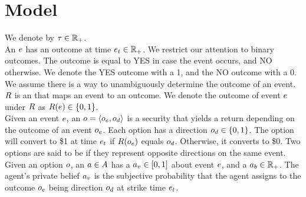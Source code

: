 \section{Model}

We denote  by $\tau\in\mathbb{R}_+$. \\

An  $e$ has an outcome at time $e_t \in \mathbb{R}_+$. 
We restrict our attention to binary outcomes. 
The outcome is equal to YES in case the event occurs, and NO otherwise. 
We denote the YES outcome with a 1, and the NO outcome with a 0.
We assume there is a way to unambiguously determine the outcome of an event. \\

$R$ is an  that maps an event to an outcome.
We denote the outcome of event $e$ under $R$ as 
$R(e) \in \{0,1\}$.\\

Given an event $e$, an  $o = \left<o_e, o_d\right>$ is a security that yields a return depending on 
the outcome of an event $o_e$. Each option has a direction 
$o_d \in \{0, 1\}$. 
The option will convert to \$1 at time $e_t$ if $R(o_e)$ equals 
$o_d$. Otherwise, it converts to \$0. Two options are said to be
 if they represent opposite directions on the same event.\\ 


Given an option $o$, an  $a\in A$ has a  
$a_v \in [0,1]$ about event $e$, and a  $a_b \in \mathbb{R}_+$.
The agent's private belief $a_v$ 
is the subjective probability that the agent
assigns to the outcome $o_e$ being direction $o_d$
at strike time $e_t$. \\

